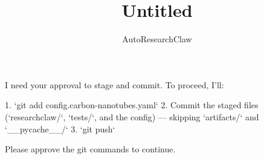 \documentclass{article}
\title{Untitled}
\author{AutoResearchClaw}
\begin{document}
\maketitle

I need your approval to stage and commit. To proceed, I'll:

1. `git add config.carbon-nanotubes.yaml`
2. Commit the staged files (`researchclaw/`, `tests/`, and the config) — skipping `artifacts/` and `__pycache__/`
3. `git push`

Please approve the git commands to continue.



\end{document}
